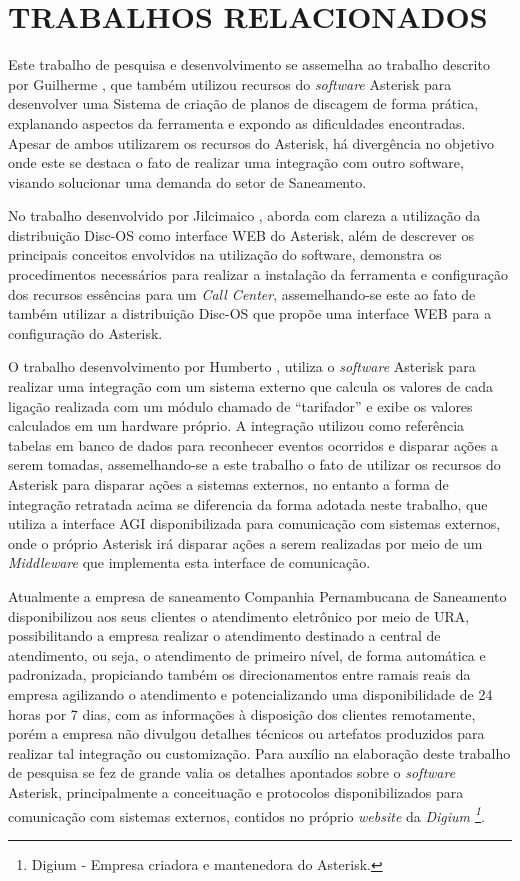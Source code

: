 \section{TRABALHOS RELACIONADOS}
Este trabalho de pesquisa e desenvolvimento se assemelha ao trabalho descrito por Guilherme \cite{VIEIRA:2007}, que também utilizou recursos do \textit{software} Asterisk para desenvolver uma Sistema de criação de planos de discagem de forma prática, explanando aspectos da ferramenta e expondo as dificuldades encontradas. Apesar de ambos utilizarem os recursos do Asterisk, há divergência no objetivo onde este se destaca o fato de realizar uma integração com outro software, visando solucionar uma demanda do setor de Saneamento.

No trabalho desenvolvido por Jilcimaico \cite{DARU:2008}, aborda com clareza a utilização da distribuição Disc-OS como interface WEB do Asterisk, além de descrever os principais conceitos envolvidos na utilização do software, demonstra os procedimentos necessários para realizar a instalação da ferramenta e configuração dos recursos essências para um \textit{Call Center}, assemelhando-se este ao fato de também utilizar a distribuição Disc-OS que propõe uma interface WEB para a configuração do Asterisk.

O trabalho desenvolvimento por Humberto \cite{CAMPOS:2007}, utiliza o \textit{software} Asterisk para realizar uma integração com um sistema externo que calcula os valores de cada ligação realizada com um módulo chamado de “tarifador” e exibe os valores calculados em um hardware próprio. A integração utilizou como referência tabelas em banco de dados para reconhecer eventos ocorridos e disparar ações a serem tomadas, assemelhando-se a este trabalho o fato de utilizar os recursos do Asterisk para disparar ações a sistemas externos, no entanto a forma de integração retratada acima se diferencia da forma adotada neste trabalho, que utiliza a interface AGI disponibilizada para comunicação com sistemas externos, onde o próprio Asterisk irá disparar ações a serem realizadas por meio de um \textit{Middleware} que implementa esta interface de comunicação.

Atualmente a empresa de saneamento Companhia Pernambucana de Saneamento \cite{COMPESA:URA} disponibilizou aos seus clientes o atendimento eletrônico por meio de URA, possibilitando a empresa realizar o atendimento destinado a central de atendimento, ou seja, o atendimento de primeiro nível, de forma automática e padronizada, propiciando também os direcionamentos entre ramais reais da empresa agilizando o atendimento e potencializando uma disponibilidade de 24 horas por 7 dias, com as informações à disposição dos clientes remotamente, porém a empresa não divulgou detalhes técnicos ou artefatos produzidos para realizar tal integração ou customização.
Para auxílio na elaboração deste trabalho de pesquisa se fez de grande valia os detalhes apontados sobre o \textit{software} Asterisk, principalmente a conceituação e protocolos disponibilizados para comunicação com sistemas externos, contidos no próprio \textit{website} da \textit{Digium \footnote{Digium - Empresa criadora e mantenedora do Asterisk.}}. 
